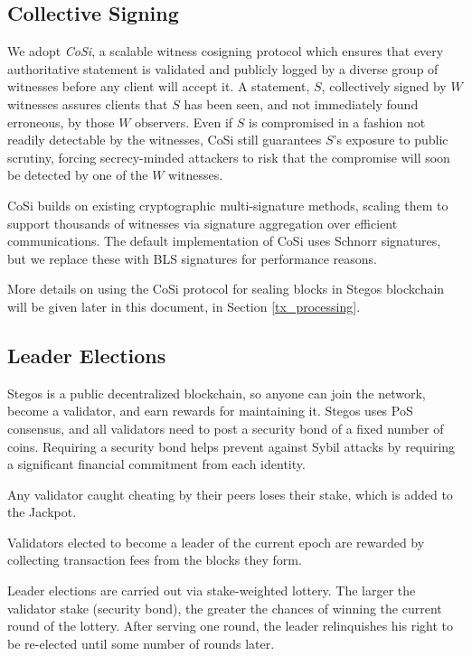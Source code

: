 \documentclass[a4paper, 10pt, conference]{ieeeconf}
\begin{document}
\subsection{Collective Signing}

We adopt \textit{CoSi}\cite{c10}\cite{c11}, a scalable witness cosigning protocol which ensures that every authoritative statement is validated and publicly logged by a diverse group of witnesses before any client will accept it. A statement, $S$, collectively signed by $W$ witnesses assures clients that $S$ has been seen, and not immediately found erroneous, by those $W$ observers. Even if $S$ is compromised in a fashion not readily detectable by the witnesses, CoSi still guarantees $S$’s exposure to public scrutiny, forcing secrecy-minded attackers to risk that the compromise will soon be detected by one of the $W$ witnesses. 

CoSi builds on existing cryptographic multi-signature methods, scaling them to support thousands of witnesses via signature aggregation over efficient communications. The default implementation of CoSi uses Schnorr signatures, but we replace these with BLS signatures for performance reasons.

More details on using the CoSi protocol for sealing blocks in Stegos blockchain will be given later in this document, in Section \ref{tx_processing}.


\subsection{Leader Elections}

Stegos is a public decentralized blockchain, so anyone can join the network, become a validator, and earn rewards for maintaining it. Stegos uses PoS consensus, and all validators need to post a security bond of a fixed number of coins. Requiring a security bond helps prevent against Sybil attacks by requiring a significant financial commitment from each identity.

Any validator caught cheating by their peers loses their stake, which is added to the Jackpot. 

Validators elected to become a leader of the current epoch are rewarded by collecting transaction fees from the blocks they form.

Leader elections are carried out via stake-weighted lottery. The larger the validator stake (security bond), the greater the chances of winning the current round of the lottery. After serving one round, the leader relinquishes his right to be re-elected until some number of rounds later.
\end{document}
